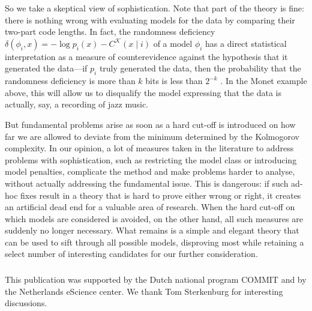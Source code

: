 \documentclass{style/llncs}
\newcommand{\K}{\mathscr K}
\begin{document}
So we take a skeptical view of sophistication. Note that part of the theory is fine: there is nothing wrong with evaluating models for the data by comparing their two-part code lengths. In fact, the randomness deficiency $\delta(\phi_i,x)=-\log p_i(x)-C^\K(x\mid i)$ of a model $\phi_i$ has a direct statistical interpretation as a measure of counterevidence against the hypothesis that it generated the data---if $p_i$ truly generated the data, then the probability that the randomness deficiency is more than $k$ bits is less than $2^{-k}$ \cite[Lemma~6]{bloem2014safe}. In the Monet example above, this will allow us to disqualify the model expressing that the data is actually, say, a recording of jazz music.

But fundamental problems arise as soon as a hard cut-off is introduced on how far we are allowed to deviate from the minimum determined by the Kolmogorov complexity. In our opinion, a lot of measures taken in the literature to address problems with sophistication, such as restricting the model class or introducing model penalties, complicate the method and make problems harder to analyse, without actually addressing the fundamental issue. This is dangerous: if such ad-hoc fixes result in a theory that is hard to prove either wrong or right, it creates an artificial dead end for a valuable area of research. When the hard cut-off on which models are considered is avoided, on the other hand, all such measures are suddenly no longer necessary. What remains is a simple and elegant theory that can be used to sift through all possible models, disproving most while retaining a select number of interesting candidates for our further consideration.

\subsubsection*{\ackname}

This publication was supported by the Dutch national program COMMIT and by  the Netherlands eScience center. We thank Tom Sterkenburg for interesting discussions.




\appendix
\end{document}
